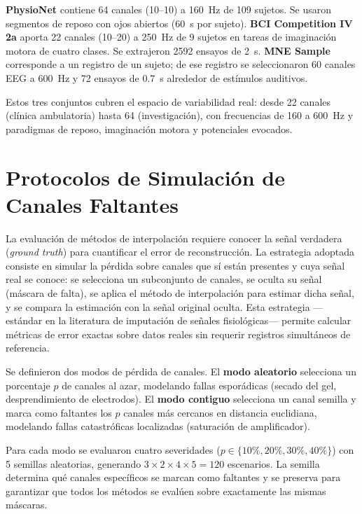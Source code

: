 \textbf{PhysioNet} \cite{goldberger2000physiobank,schalk2004bci2000} contiene 64 canales (10--10) a 160~Hz de 109 sujetos. Se usaron segmentos de reposo con ojos abiertos (60~s por sujeto). \textbf{BCI Competition IV 2a} \cite{brunner2008bci} aporta 22 canales (10--20) a 250~Hz de 9 sujetos en tareas de imaginación motora de cuatro clases. Se extrajeron 2592 ensayos de 2~s. \textbf{MNE Sample} \cite{gramfort2013meg} corresponde a un registro de un sujeto; de ese registro se seleccionaron 60 canales EEG a 600~Hz y 72 ensayos de 0.7~s alrededor de estímulos auditivos.

Estos tres conjuntos cubren el espacio de variabilidad real: desde 22 canales (clínica ambulatoria) hasta 64 (investigación), con frecuencias de 160 a 600~Hz y paradigmas de reposo, imaginación motora y potenciales evocados.
\section{Protocolos de Simulación de Canales Faltantes}

La evaluación de métodos de interpolación requiere conocer la señal verdadera (\textit{ground truth}) para cuantificar el error de reconstrucción. La estrategia adoptada consiste en simular la pérdida sobre canales que sí están presentes y cuya señal real se conoce: se selecciona un subconjunto de canales, se oculta su señal (máscara de falta), se aplica el método de interpolación para estimar dicha señal, y se compara la estimación con la señal original oculta. Esta estrategia ---estándar en la literatura de imputación de señales fisiológicas--- permite calcular métricas de error exactas sobre datos reales sin requerir registros simultáneos de referencia.

Se definieron dos modos de pérdida de canales. El \textbf{modo aleatorio} selecciona un porcentaje $p$ de canales al azar, modelando fallas esporádicas (secado del gel, desprendimiento de electrodos). El \textbf{modo contiguo} selecciona un canal semilla y marca como faltantes los $p$ canales más cercanos en distancia euclidiana, modelando fallas catastróficas localizadas (saturación de amplificador).

Para cada modo se evaluaron cuatro severidades ($p \in \{10\%, 20\%, 30\%, 40\%\}$) con 5 semillas aleatorias, generando $3 \times 2 \times 4 \times 5 = 120$ escenarios. La semilla determina qué canales específicos se marcan como faltantes y se preserva para garantizar que todos los métodos se evalúen sobre exactamente las mismas máscaras.

